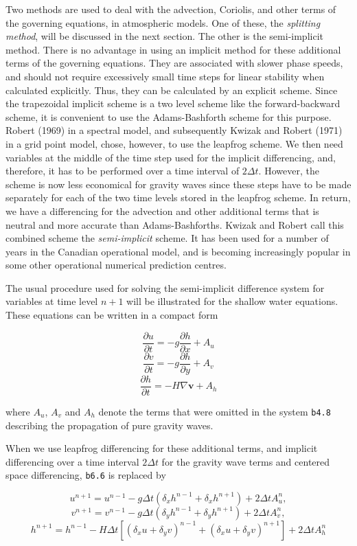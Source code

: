 Two methods are used to deal with the advection, Coriolis, and other
terms of the governing equations, in atmospheric models. One of these,
the \emph{splitting method}, will be discussed in the next section. The
other is the semi-implicit method. There is no advantage in using an
implicit method for these additional terms of the governing equations.
They are associated with slower phase speeds, and should not require
excessively small time steps for linear stability when calculated
explicitly. Thus, they can be calculated by an explicit scheme. Since
the trapezoidal implicit scheme is a two level scheme like the
forward-backward scheme, it is convenient to use the Adams-Bashforth
scheme for this purpose. Robert (1969) in a spectral model, and
subsequently Kwizak and Robert (1971) in a grid point model, chose,
however, to use the leapfrog scheme. We then need variables at the
middle of the time step used for the implicit differencing, and,
therefore, it has to be performed over a time interval of \(2\Delta t\).
However, the scheme is now less economical for gravity waves since these
steps have to be made separately for each of the two time levels stored
in the leapfrog scheme. In return, we have a differencing for the
advection and other additional terms that is neutral and more accurate
than Adams-Bashforth\textquotesingle s. Kwizak and Robert call this
combined scheme the \emph{semi-implicit} scheme. It has been used for a
number of years in the Canadian operational model, and is becoming
increasingly popular in some other operational numerical prediction
centres.

The usual procedure used for solving the semi-implicit difference system
for variables at time level \(n + 1\) will be illustrated for the
shallow water equations. These equations can be written in a compact
form

{\[\frac{\partial u}{\partial t} = - g\frac{\partial h}{\partial x} + A_{u}\]\[\frac{\partial v}{\partial t} = - g\frac{\partial h}{\partial y} + A_{v}\]\[\frac{\partial h}{\partial t} = - H\nabla\textbf{v} + A_{h}\]}

where \(A_{u}\), \(A_{v}\) and \(A_{h}\) denote the terms that were
omitted in the system \texttt{b4.8} describing the propagation of pure
gravity waves.

When we use leapfrog differencing for these additional terms, and
implicit differencing over a time interval \(2\Delta t\) for the gravity
wave terms and centered space differencing, \texttt{b6.6} is replaced by

{\[u^{n + 1} = u^{n - 1} - g\Delta t\left( \delta_{x}h^{n - 1} + \delta_{x}h^{n + 1} \right) + 2\Delta t A_{u}^{n},\]\[v^{n + 1} = v^{n - 1} - g\Delta t\left( \delta_{y}h^{n - 1} + \delta_{y}h^{n + 1} \right) + 2\Delta t A_{v}^{n},\]\[h^{n + 1} = h^{n - 1} - H\Delta t\left[ \left( \delta_{x}u + \delta_{y}v \right)^{n - 1} + \left( \delta_{x}u + \delta_{y}v \right)^{n + 1} \right] +  2\Delta t A_{h}^{n}\]}

